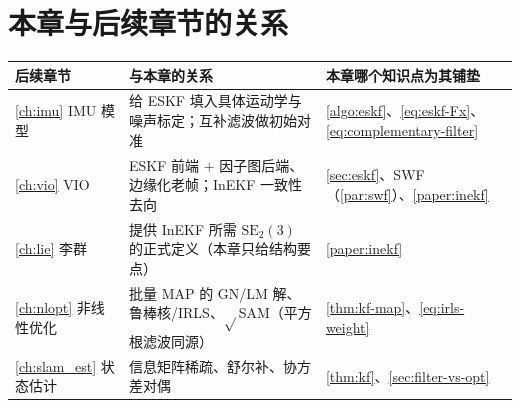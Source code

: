\section*{本章与后续章节的关系}
\begin{table}[H]\centering\small
\begin{tabular}{lll}
\toprule
后续章节 & 与本章的关系 & 本章哪个知识点为其铺垫 \\
\midrule
\cref{ch:imu} IMU 模型 & 给 ESKF 填入具体运动学与噪声标定；互补滤波做初始对准 & \cref{algo:eskf}、\cref{eq:eskf-Fx}、\cref{eq:complementary-filter} \\
\cref{ch:vio} VIO & ESKF 前端 + 因子图后端、边缘化老帧；InEKF 一致性去向 & \cref{sec:eskf}、SWF（\cref{par:swf}）、\cref{paper:inekf} \\
\cref{ch:lie} 李群 & 提供 InEKF 所需 $\mathrm{SE}_2(3)$ 的正式定义（本章只给结构要点） & \cref{paper:inekf} \\
\cref{ch:nlopt} 非线性优化 & 批量 MAP 的 GN/LM 解、鲁棒核/IRLS、$\sqrt{}$SAM（平方根滤波同源） & \cref{thm:kf-map}、\cref{eq:irls-weight} \\
\cref{ch:slam_est} 状态估计 & 信息矩阵稀疏、舒尔补、协方差对偶 & \cref{thm:kf}、\cref{sec:filter-vs-opt} \\
\bottomrule
\end{tabular}
\end{table}

